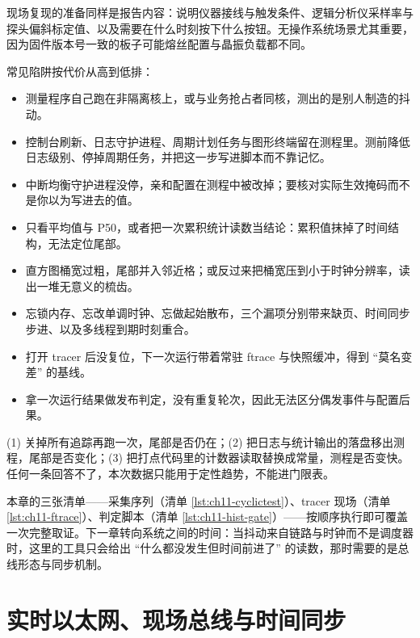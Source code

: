 \documentclass[12pt,a4paper,fontset=fandol]{ctexbook}
\begin{document}
现场复现的准备同样是报告内容：说明仪器接线与触发条件、逻辑分析仪采样率与探头偏斜标定值、以及需要在什么时刻按下什么按钮。无操作系统场景尤其重要，因为固件版本号一致的板子可能熔丝配置与晶振负载都不同。

常见陷阱按代价从高到低排：

\begin{itemize}
  \item 测量程序自己跑在非隔离核上，或与业务抢占者同核，测出的是别人制造的抖动。
  \item 控制台刷新、日志守护进程、周期计划任务与图形终端留在测程里。测前降低日志级别、停掉周期任务，并把这一步写进脚本而不靠记忆。
  \item 中断均衡守护进程没停，亲和配置在测程中被改掉；要核对实际生效掩码而不是你以为写进去的值。
  \item 只看平均值与 P50，或者把一次累积统计读数当结论：累积值抹掉了时间结构，无法定位尾部。
  \item 直方图桶宽过粗，尾部并入邻近格；或反过来把桶宽压到小于时钟分辨率，读出一堆无意义的梳齿。
  \item 忘锁内存、忘改单调时钟、忘做起始散布，三个漏项分别带来缺页、时间同步步进、以及多线程到期时刻重合。
  \item 打开 tracer 后没复位，下一次运行带着常驻 ftrace 与快照缓冲，得到 ``莫名变差'' 的基线。
  \item 拿一次运行结果做发布判定，没有重复轮次，因此无法区分偶发事件与配置后果。
\end{itemize}

\begin{warning}[title={观测者即扰动源：三条自检}]
(1) 关掉所有追踪再跑一次，尾部是否仍在；(2) 把日志与统计输出的落盘移出测程，尾部是否变化；(3) 把打点代码里的计数器读取替换成常量，测程是否变快。任何一条回答不了，本次数据只能用于定性趋势，不能进门限表。
\end{warning}

本章的三张清单——采集序列（清单 \ref{lst:ch11-cyclictest}）、tracer 现场（清单 \ref{lst:ch11-ftrace}）、判定脚本（清单 \ref{lst:ch11-hist-gate}）——按顺序执行即可覆盖一次完整取证。下一章转向系统之间的时间：当抖动来自链路与时钟而不是调度器时，这里的工具只会给出 ``什么都没发生但时间前进了'' 的读数，那时需要的是总线形态与同步机制。

\chapter{实时以太网、现场总线与时间同步}
\label{ch:ch12-rt-bus-tsn}
\end{document}

